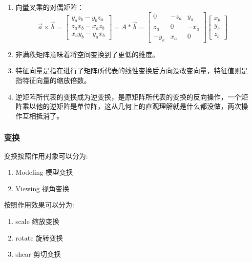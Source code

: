 \documentclass[UTF8]{ctexbook}
\begin{document}
{{{{        \begin{enumerate}
          \item {向量叉乘的对偶矩阵：
                $$\vec{a} \times \vec{b}
                  =
                  \left[\begin{matrix}
                      y_az_b - y_bz_a \\
                      z_ax_b - x_az_b \\
                      x_ay_b - y_ax_b
                    \end{matrix}\right]
                  =
                  A * \vec{b}
                  =
                  \left[\begin{matrix}
                      0    & -z_a & y_a  \\
                      z_a  & 0    & -x_a \\
                      -y_a & x_a  & 0
                    \end{matrix}\right]
                  \left[\begin{array}{c}
                      x_b \\
                      y_b \\
                      z_b
                    \end{array}
                    \right]
                $$
                }
          \item 非满秩矩阵意味着将空间变换到了更低的维度。
          \item 特征向量是指在进行了矩阵所代表的线性变换后方向没改变向量，特征值则是指特征向量的缩放倍数。
          \item 逆矩阵所代表的变换成为逆变换，是原矩阵所代表的变换的反向操作，一个矩阵乘以他的逆矩阵是单位阵，这从几何上的直观理解就是什么都没做，两次操作互相抵消了。
        \end{enumerate}
      }

      \subsubsection{变换}{
        变换按照作用对象可以分为:
        \begin{enumerate}
          \item Modeling 模型变换
          \item Viewing 视角变换
        \end{enumerate}

        按照作用效果可以分为:
        \begin{enumerate}
          \item scale 缩放变换
          \item rotate 旋转变换
          \item shear 剪切变换
        \end{enumerate}

}}}}
\end{document}
